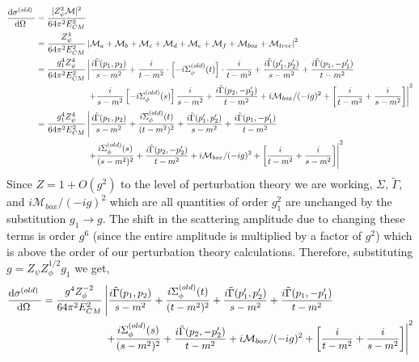\documentclass[12pt]{extarticle}
\begin{document}
\begin{align*}
\frac{\mathrm{d}\sigma^{(old)} \:}{\mathrm{d}\Omega \:} & = \frac{|Z^2_{\psi} \mathcal{M}|^2}{64 \pi^2 E_{CM}^2}
\\
& = \frac{Z^4_{\psi}}{64 \pi^2 E_{CM}^2} \left| \mathcal{M}_a + \mathcal{M}_b + \mathcal{M}_c + \mathcal{M}_d + \mathcal{M}_e + \mathcal{M}_f + \mathcal{M}_{box} + \mathcal{M}_{tree} \right|^2 
\\
& = \frac{g_1^4 Z^4_{\psi}}{64 \pi^2 E_{CM}^2} \left|  \frac{i\tilde{\Gamma}(p_1, p_2)}{s  - m^2} + \frac{i}{t - m^2} \cdot\left[ -i \Sigma_\phi^{(old)}(t) \right] \cdot \frac{i}{t - m^2} + \frac{i \tilde{\Gamma}(p_1', p_2')}{s - m^2} 
+  \frac{i\tilde{\Gamma}(p_1, -p_1')}{t - m^2} \right.
\\ 
& \left.
\quad \quad \quad \quad \quad \quad 
+ \frac{i}{s - m^2} \left[- i \Sigma_\phi^{(old)}(s) \right] \frac{i}{s - m^2} + \frac{i \tilde{\Gamma}(p_2, -p_2')}{t - m^2} + i\mathcal{M}_{box}/(-ig)^2 +  \left[\frac{i}{t - m^2 } + \frac{i}{s - m^2 }\right] \right|^2 
\\
& = \frac{g_1^4 Z^4_{\psi}}{64 \pi^2 E_{CM}^2} \left|  \frac{ i\tilde{\Gamma}(p_1, p_2)}{s  - m^2} + \frac{i \Sigma_\phi^{(old)}(t)}{(t - m^2)^2} + \frac{i\tilde{\Gamma}(p_1', p_2')}{s - m^2} 
+  \frac{i\tilde{\Gamma}(p_1, -p_1')}{t - m^2} \right.
\\ 
& \left.
\quad \quad \quad \quad \quad \quad 
+ \frac{i \Sigma_\phi^{(old)}(s)}{(s - m^2)^2} + \frac{i\tilde{\Gamma}(p_2, -p_2')}{t - m^2} + i\mathcal{M}_{box}/(-ig)^2 + \left[\frac{i}{t - m^2 } + \frac{i}{s - m^2 }\right] \right|^2 
\end{align*} 
Since $Z = 1 + O(g^2)$ to the level of perturbation theory we are working, $\Sigma$, $\tilde{\Gamma}$, and $i\mathcal{M}_{box}/(-ig)^2$ which are all quantities of order $g_1^2$ are unchanged by the substitution $g_1 \to g$. The shift in the scattering amplitude due to changing these terms is order $g^6$ (since the entire amplitude is multiplied by a factor of $g^2$) which is above the order of our perturbation theory calculations. Therefore, substituting $g = Z_\psi Z_\phi^{1/2} g_1$ we get,
\begin{align*}
\frac{\mathrm{d}\sigma^{(old)} \:}{\mathrm{d}\Omega \:} &= \frac{g^4 Z_\phi^{-2}}{64 \pi^2 E_{CM}^2} \left|  \frac{i \tilde{\Gamma}(p_1, p_2)}{s  - m^2} + \frac{i \Sigma_\phi^{(old)}(t)}{(t - m^2)^2} + \frac{i\tilde{\Gamma}(p_1', p_2')}{s - m^2} 
+  \frac{i\tilde{\Gamma}(p_1, -p_1')}{t - m^2} \right.
\\ 
& \left.
\quad \quad \quad \quad \quad \quad 
+ \frac{i \Sigma_\phi^{(old)}(s)}{(s - m^2)^2} + \frac{i\tilde{\Gamma}(p_2, -p_2')}{t - m^2} + i\mathcal{M}_{box}/(-ig)^2 + \left[\frac{i}{t - m^2 } + \frac{i}{s - m^2 }\right] \right|^2 
\end{align*}  
\end{document}
